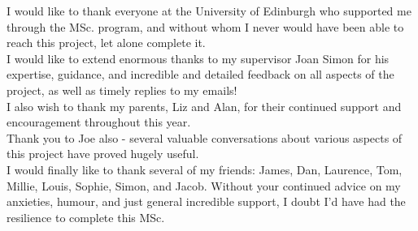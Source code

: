 \documentclass[12pt,a4paper]{report}
\numberwithin{equation}{section}
\theoremstyle{definition}
\theoremstyle{theorem}
\theoremstyle{theorem}
\theoremstyle{example}
\theoremstyle{definition}
\begin{document}
I would like to thank everyone at the University of Edinburgh who supported me through the MSc. program, and without whom I never would have been able to reach this project, let alone complete it.\\
I would like to extend enormous thanks to my supervisor Joan Simon for his expertise, guidance, and incredible and detailed feedback on all aspects of the project, as well as timely replies to my emails!\\
I also wish to thank my parents, Liz and Alan, for their continued support and encouragement throughout this year.\\
Thank you to Joe also - several valuable conversations about various aspects of this project have proved hugely useful.\\
I would finally like to thank several of my friends: James, Dan, Laurence, Tom, Millie, Louis, Sophie, Simon, and Jacob. Without your continued advice on my anxieties, humour, and just general incredible support, I doubt I'd have had the resilience to complete this MSc. 

\tableofcontents
\listoftables
\listoffigures

\end{document}

